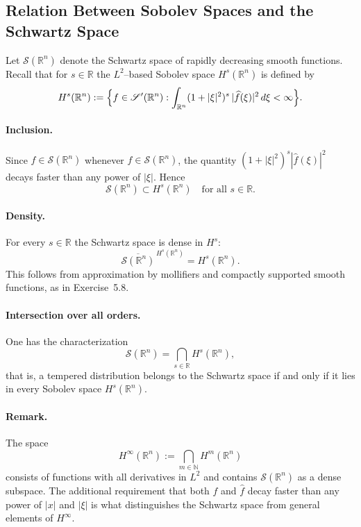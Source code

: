\documentclass[12pt,a4paper]{article}
\theoremstyle{plain}
\theoremstyle{definition}
\theoremstyle{remark}
\theoremstyle{remark}
\begin{document}
\subsection*{Relation Between Sobolev Spaces and the Schwartz Space}

Let $\mathscr{S}(\mathbb{R}^n)$ denote the Schwartz space of rapidly
decreasing smooth functions. Recall that for $s\in\mathbb{R}$ the
$L^2$--based Sobolev space $H^s(\mathbb{R}^n)$ is defined by
\[
H^s(\mathbb{R}^n)
:= \Bigl\{ f\in\mathscr{S}'(\mathbb{R}^n) :
\int_{\mathbb{R}^n} (1+|\xi|^2)^s \,|\widehat{f}(\xi)|^2 \, d\xi
< \infty \Bigr\}.
\]

\paragraph{Inclusion.}
Since $\widehat{f}\in\mathscr{S}(\mathbb{R}^n)$ whenever
$f\in\mathscr{S}(\mathbb{R}^n)$, the quantity
$(1+|\xi|^2)^s|\widehat{f}(\xi)|^2$ decays faster than any power of
$|\xi|$. Hence
\[
\mathscr{S}(\mathbb{R}^n) \subset H^s(\mathbb{R}^n)
\quad\text{for all } s\in\mathbb{R}.
\]

\paragraph{Density.}
For every $s\in\mathbb{R}$ the Schwartz space is dense in $H^s$:
\[
\overline{\mathscr{S}(\mathbb{R}^n)}^{\,H^s(\mathbb{R}^n)}
= H^s(\mathbb{R}^n).
\]
This follows from approximation by mollifiers and compactly supported
smooth functions, as in Exercise~5.8.

\paragraph{Intersection over all orders.}
One has the characterization
\[
\mathscr{S}(\mathbb{R}^n)
= \bigcap_{s\in\mathbb{R}} H^s(\mathbb{R}^n),
\]
that is, a tempered distribution belongs to the Schwartz space if and
only if it lies in every Sobolev space $H^s(\mathbb{R}^n)$.

\paragraph{Remark.}
The space
\[
H^\infty(\mathbb{R}^n)
:= \bigcap_{m\in\mathbb{N}} H^m(\mathbb{R}^n)
\]
consists of functions with all derivatives in $L^2$ and contains
$\mathscr{S}(\mathbb{R}^n)$ as a dense subspace. The additional
requirement that both $f$ and $\widehat{f}$ decay faster than any power
of $|x|$ and $|\xi|$ is what distinguishes the Schwartz space from
general elements of $H^\infty$.
\end{document}
